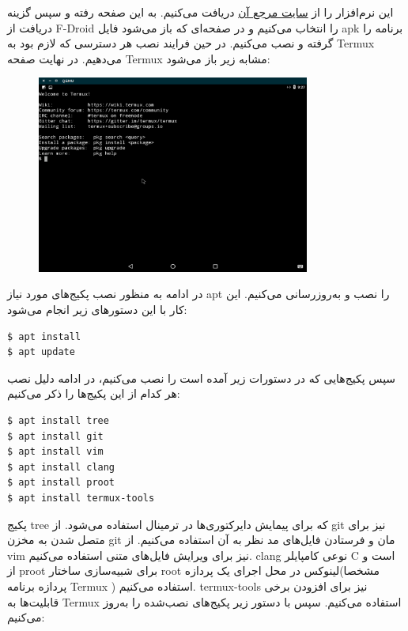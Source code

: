 \documentclass{article}
\begin{document}
این نرم‌افزار را از
\href{http://www.termux.com/}{سایت مرجع آن}
دریافت می‌کنیم. به این صفحه رفته و سپس گزینه دریافت از F-Droid را انتخاب می‌کنیم و در صفحه‌ای که باز می‌شود فایل apk برنامه را گرفته و نصب می‌کنیم. در حین فرایند نصب هر دسترسی که لازم بود به Termux می‌دهیم. در نهایت صفحه Termux مشابه زیر باز می‌شود:

\begin{figure}[h]
	\centering	
	\includegraphics[width = 0.8\textwidth]{images/package5.png}
\end{figure}

در ادامه به منظور نصب پکیج‌های مورد نیاز apt را نصب و به‌روز‌رسانی می‌کنیم. این کار با این دستورهای زیر انجام می‌شود:

\begin{latin}
\begin{verbatim}
$ apt install
$ apt update
\end{verbatim}
\end{latin}

سپس پکیج‌هایی که در دستورات زیر آمده است را نصب می‌کنیم، در ادامه دلیل نصب هر کدام از این پکیج‌ها را ذکر می‌کنیم:

\begin{latin}
\begin{verbatim}
$ apt install tree
$ apt install git
$ apt install vim
$ apt install clang
$ apt install proot
$ apt install termux-tools
\end{verbatim}
\end{latin}

پکیج tree که برای پیمایش دایرکتوری‌ها در ترمینال استفاده می‌شود. از git نیز برای متصل شدن به مخزن git مان و فرستادن فایل‌های مد نظر به آن استفاده می‌کنیم. از vim نیز برای ویرایش فایل‌های متنی استفاده می‌کنیم. clang نوعی کامپایلر C است و از proot برای شبیه‌سازی ساختار root لینوکس در محل اجرای یک پردازه(مشخصا پردازه برنامه Termux ) استفاده می‌کنیم. termux-tools نیز برای افزودن برخی قابلیت‌ها به Termux استفاده می‌کنیم. سپس با دستور زیر پکیج‌های نصب‌شده را به‌روز می‌کنیم:
\end{document}
